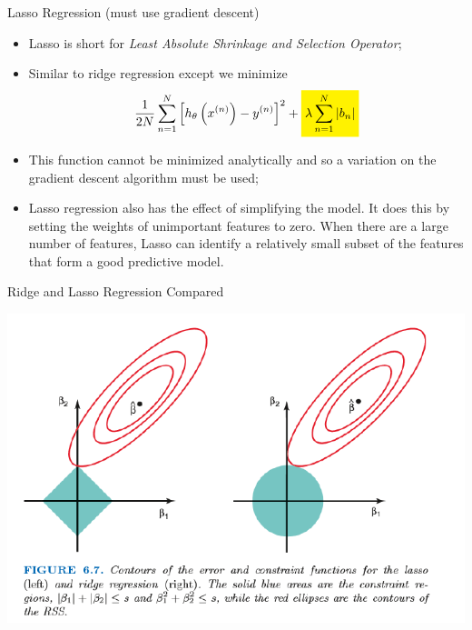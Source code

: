 \documentclass[11pt]{beamer}
\newcommand{\highlight}[1]{%
  \colorbox{yellow!100}{$\displaystyle#1$}}
\begin{document}
\begin{frame}{Lasso Regression (must use gradient descent)}
	\begin{itemize}
	\item Lasso is short for \textit{Least Absolute Shrinkage and Selection Operator};
		\item Similar to ridge regression except we minimize
		\begin{equation}
		\frac{1}{2N} \sum\limits_{n=1}^N \left[h_\theta \left( x^{(n)} \right) - y ^{(n)}\right]^2 + \highlight{\lambda \sum\limits_{n=1}^N \vert b_n \vert}
		\end{equation}
		\item This function cannot be minimized analytically and so a variation on the gradient descent algorithm must be used;
		\item Lasso regression also has the effect of simplifying the model. It does this by setting the weights of unimportant features to zero. When there are a large number of features, Lasso can identify a relatively small subset of the features that form a good predictive model.
	\end{itemize}
\end{frame}
\begin{frame}{Ridge and Lasso Regression Compared}
\begin{center}
\includegraphics[scale=.55]{../05-pictures/lesson-2-2_pic_16.png} 
\end{center}
\end{frame}
\end{document}

